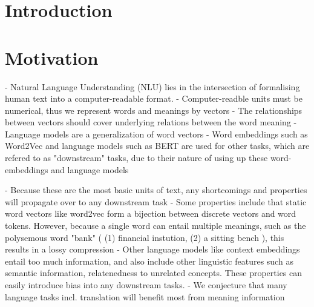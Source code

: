 \documentclass[a4paper,12pt,twoside,openright]{report}
\begin{document}
\pagestyle{empty}
\singlespacing

\onehalfspacing

\singlespacing


\setcounter{page}{0}
\pagestyle{plain}
\tableofcontents
\listoffigures
\listoftables

\onehalfspacing

\newcommand{\norm}[1]{\left\lVert#1\right\rVert}
\newcommand{\bracket}[1]{\left[#1\right]}
\newcommand{\absdet}[1]{\left|#1\right|}

\chapter{Introduction}

\setcounter{page}{1} 

\newpage
\chapter{Motivation}
 
- Natural Language Understanding (NLU) lies in the intersection of formalising human text into a computer-readable format.
- Computer-readble units must be numerical, thus we represent words and meanings by vectors
- The relationships between vectors should cover underlying relations between the word meaning
- Language models are a generalization of word vectors
- Word embeddings such as Word2Vec and language models such as BERT are used for other tasks, which are refered to as "downstream" tasks, due to their nature of using up these word-embeddings and language models

- Because these are the most basic units of text, any shortcomings and properties will propagate over to any downstream task
- Some properties include that static word vectors like word2vec form a bijection between discrete vectors and word tokens. 
However, because a single word can entail multiple meanings, such as the polysemous word "bank" ( (1) financial instution, (2) a sitting bench ), this results in a lossy compression
- Other language models like context embeddings entail too much information, and also include other linguistic features such as semantic information, relatenedness to unrelated concepts.
These properties can easily introduce bias into any downstream tasks.
- We conjecture that many language tasks incl. translation will benefit most from meaning information
\end{document}
